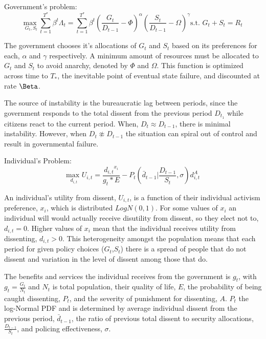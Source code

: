 \documentclass[12pt]{article}
\begin{document}
\begin{spacing}{1.5}
\vspace{.5 em}

\noindent Government's problem:
\begin{equation}
{\underset{G_t,S_t}{\text{max }}} \sum\limits_{t=1}^{T^*} \beta^t {\Lambda}_t = \sum\limits_{t=1}^{T^*} \beta^t\left(\frac{G_t}{D_{t-1}}-\Phi\right)^\alpha \left(\frac{S_t}{D_{t-1}}-\Omega\right)^\gamma   \text{s.t. } G_t+S_t=R_t
\end{equation}

The government chooses it's allocations of $G_t$ and $S_t$ based on its preferences for each, $\alpha$ and $\gamma$ respectively. A minimum amount of resources must be allocated to $G_t$ and $S_t$ to avoid anarchy, denoted by $\Phi$ and $\Omega$. This function is optimized across time to $T_*$, the inevitable point of eventual state failure, and discounted at rate $\Beta$.  

The source of instability is the bureaucratic lag between periods, since the government responds to the total dissent from the previous period $D_{t_1}$ while citizens react to the current period. When, $D_t \approx D_{t-1}$, there is minimal instability. However, when $D_t \not\approx D_{t-1}$ the situation can spiral out of control and result in governmental failure. 

\vspace{.5 em}
\noindent Individual's Problem:
\begin{equation}
{\underset{d_{i,t}}{\text{max }}}  U_{i,t}= \frac{{d_{i,t}}^{{x}_i}}{g_t * E} - P_t \left( \bar{d}_{t-1} \Bigg|\frac{D_{t-1}}{S_t},\sigma \right)d_{i,t}^A
\end{equation}

An individual's utility from dissent, $U_{i,t}$, is a function of their individual activism preference, $x_i$, which is distributed $LogN(0,1)$. For some values of $x_i$ an individual will would actually receive disutility from dissent, so they elect not to, $d_{i,t}=0$. Higher values of $x_i$ mean that the individual receives utility from dissenting, $d_{i,t}>0$. This heterogeneity amongst the population means that each period for given policy choices ($G_t$,$S_t$) there is a spread of people that do not dissent and variation in the level of dissent among those that do.  

The benefits and services the individual receives from the government is $g_t$, with $g_t=\frac{G_t}{N_t}$ and $N_t$ is total population, their quality of life, $E$, the probability of being caught dissenting, $P_t$, and the severity of punishment for dissenting, $A$. $P_t$ the log-Normal PDF and is determined by average individual dissent from the previous period, $\bar{d}_{t-1}$, the ratio of previous total dissent to security allocations, $\frac{D_{t-1}}{S_t}$, and policing effectiveness, $\sigma$. 


\end{spacing}
\end{document}
